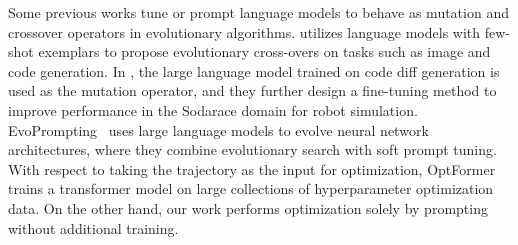 Some previous works tune or prompt language models to behave as mutation and crossover operators in evolutionary algorithms.
\citet{meyerson2023language} utilizes language models with few-shot exemplars to propose evolutionary cross-overs on tasks such as image and code generation.
In \citet{lehman2022evolution}, the large language model trained on code diff generation is used as the mutation operator, and they further design a fine-tuning method to improve performance in the Sodarace domain for robot simulation.
EvoPrompting~\citep{chen2023evoprompting} uses large language models to evolve neural network architectures, where they combine evolutionary search with soft prompt tuning.
With respect to taking the trajectory as the input for optimization, OptFormer~\citep{chen2022towards} trains a transformer model on large collections of hyperparameter optimization data.
On the other hand, our work performs optimization solely by prompting without additional training.


